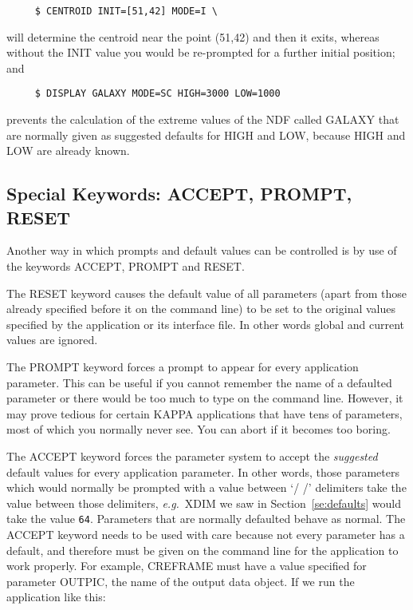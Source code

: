 \small
\begin{verbatim}
     $ CENTROID INIT=[51,42] MODE=I \
\end{verbatim}
\normalsize
will determine the centroid near the point (51,42) and then it exits,
whereas without the INIT value you would be re-prompted for a further
initial position; and

\small
\begin{verbatim}
     $ DISPLAY GALAXY MODE=SC HIGH=3000 LOW=1000
\end{verbatim}
\normalsize
prevents the calculation of the extreme values of the NDF called
GALAXY that are normally given as suggested defaults for HIGH and LOW,
because HIGH and LOW are already known.

\subsection{Special Keywords: ACCEPT, PROMPT, RESET}
\label{se:iclkey}
Another way in which prompts and default values can be controlled is
by use of the keywords ACCEPT, PROMPT and RESET.

The RESET keyword causes the default value of all parameters (apart
from those already specified before it on the command line) to be
set to the original values specified by the application or its interface
file.  In other words global and current values are ignored.

The PROMPT keyword forces a prompt to appear for every application
parameter.  This can be useful if you cannot remember the name of
a defaulted parameter or there would be too much to type on the
command line.  However, it may prove tedious for certain {\small KAPPA}
applications that have tens of parameters, most of which you normally
never see.  You can abort if it becomes too boring.

The ACCEPT keyword forces the parameter system to accept the
{\em suggested\/} default values for every application parameter.  In
other words, those parameters which would normally be prompted with
a value between `/ /' delimiters take the value between those
delimiters, {\it e.g.}\ XDIM we saw in Section~\ref{se:defaults}
would take the value {\tt 64}.  Parameters that are normally defaulted
behave as normal.  The ACCEPT keyword needs to be used
with care because not every parameter has a default, and therefore must
be given on the command line for the application to work properly. For
example, CREFRAME must have a value specified for parameter OUTPIC, the
name of the output data object. If we run the application like this:

